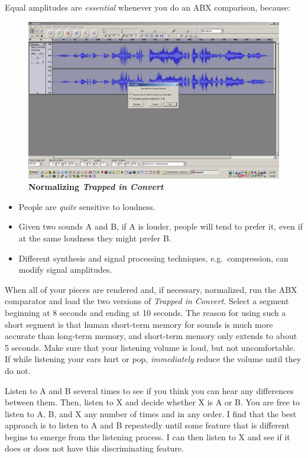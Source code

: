\documentclass[english,11pt,letterpaper,onecolumn]{scrartcl}
\begin{document}
Equal amplitudes are \emph{essential} whenever you do an ABX comparison, 
because:

\begin{figure}[!htp]
	\centering
		\includegraphics[width=1.0\textwidth]{normalize.png}
	\caption{\textbf{Normalizing \emph{Trapped in Convert}}}
	\label{fig:normalize}
\end{figure}

\begin{itemize}
	\item People are \emph{quite} sensitive to loudness.
	\item Given two sounds A and B, if A is louder, people will tend to prefer 
it, even if at the same loudness they might prefer B.
	\item Different synthesis and signal processing techniques, e.g.\ 
compression, can modify signal amplitudes.
\end{itemize}

When all of your pieces are rendered and, if necessary, normalized, run the 
ABX comparator and load the two versions of \emph{Trapped in Convert}. Select a 
segment beginning at 8 seconds and ending at 10 seconds. The reason for using 
such a short segment is that human short-term memory for sounds is much more 
accurate than long-term memory, and short-term memory only extends to about 5 
seconds. Make sure that your listening volume is loud, but not uncomfortable. 
If while listening your ears hurt or pop, \emph{immediately} reduce the volume
until they do not.

Listen to A and B several times to see if you think you can hear any 
differences between them. Then, listen to X and decide whether X is A or B. 
You are free to listen to A, B, and X any number of times and in any order. I 
find that the best approach is to listen to A and B repeatedly until some 
feature that is different begins to emerge from the listening process. I can 
then listen to X and see if it does or does not have this discriminating 
feature.
\end{document}
